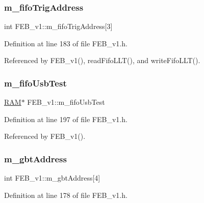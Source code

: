 \subsubsection{\texorpdfstring{m\+\_\+fifo\+Trig\+Address}{m\_fifoTrigAddress}}
{\footnotesize\ttfamily int F\+E\+B\+\_\+v1\+::m\+\_\+fifo\+Trig\+Address\mbox{[}3\mbox{]}\hspace{0.3cm}{\ttfamily [private]}}



Definition at line 183 of file F\+E\+B\+\_\+v1.\+h.



Referenced by F\+E\+B\+\_\+v1(), read\+Fifo\+L\+L\+T(), and write\+Fifo\+L\+L\+T().

\mbox{\label{classFEB__v1_a5850ce498462009212ad3f313fcf0bd6}} 
\subsubsection{\texorpdfstring{m\+\_\+fifo\+Usb\+Test}{m\_fifoUsbTest}}
{\footnotesize\ttfamily \hyperlink{classRAM}{R\+AM}$\ast$ F\+E\+B\+\_\+v1\+::m\+\_\+fifo\+Usb\+Test\hspace{0.3cm}{\ttfamily [private]}}



Definition at line 197 of file F\+E\+B\+\_\+v1.\+h.



Referenced by F\+E\+B\+\_\+v1().

\mbox{\label{classFEB__v1_ac625855df976f16694178f1a4c0eef1e}} 
\subsubsection{\texorpdfstring{m\+\_\+gbt\+Address}{m\_gbtAddress}}
{\footnotesize\ttfamily int F\+E\+B\+\_\+v1\+::m\+\_\+gbt\+Address\mbox{[}4\mbox{]}\hspace{0.3cm}{\ttfamily [private]}}



Definition at line 178 of file F\+E\+B\+\_\+v1.\+h.



